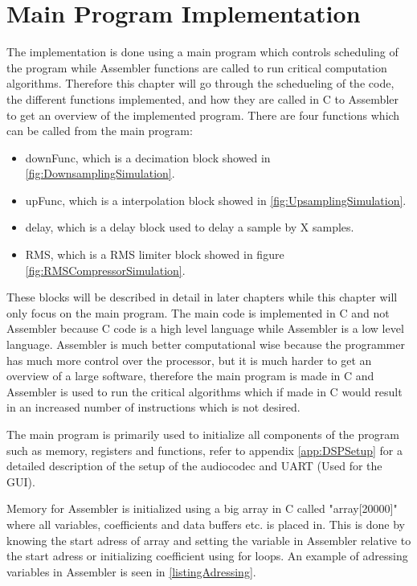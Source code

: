 \chapter{Main Program Implementation}
The implementation is done using a main program which controls scheduling of the program while Assembler functions are called to run critical computation algorithms. Therefore this chapter will go through the schedueling of the code, the different functions implemented, and how they are called in C to Assembler to get an overview of the implemented program. There are four functions which can be called from the main program:
\begin{itemize}
\item downFunc, which is a decimation block showed in \autoref{fig:DownsamplingSimulation}.
\item upFunc, which is a interpolation block showed in \autoref{fig:UpsamplingSimulation}.
\item delay, which is a delay block used to delay a sample by X samples.
\item RMS, which is a RMS limiter block showed in figure \autoref{fig:RMSCompressorSimulation}. 
\end{itemize}
These blocks will be described in detail in later chapters while this chapter will only focus on the main program. The main code is implemented in C and not Assembler because C code is a high level language while Assembler is a low level language. Assembler is much better computational wise because the programmer has much more control over the processor, but it is much harder to get an overview of a large software, therefore the main program is made in C and Assembler is used to run the critical algorithms which if made in C would result in an increased number of instructions which is not desired. 

The main program is primarily used to initialize all components of the program such as memory, registers and functions, refer to appendix \autoref{app:DSPSetup} for a detailed description of the setup of the audiocodec and UART (Used for the GUI). 

Memory for Assembler is initialized using a big array in C called "array[20000]" where all variables, coefficients and data buffers etc. is placed in. This is done by knowing the start adress of array and setting the variable in Assembler relative to the start adress or initializing coefficient using for loops. An example of adressing variables in Assembler is seen in \autoref{listingAdressing}.

